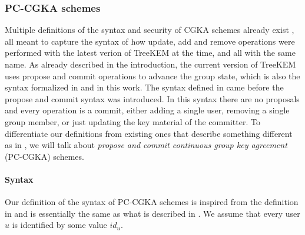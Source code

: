 \subsubsection{PC-CGKA schemes}

Multiple definitions of the syntax and security of CGKA schemes already exist \cite{rtreekem,ttkem,modular-group-messaging}, all meant to capture the syntax of how update, add and remove operations were performed with the latest verion of TreeKEM at the time, and all with the same name. As already described in the introduction, the current version of TreeKEM uses propose and commit operations to advance the group state, which is also the syntax formalized in \cite{modular-group-messaging} and in this work. The syntax defined in \cite{rtreekem,ttkem} came before the propose and commit syntax was introduced. In this syntax there are no proposals and every operation is a commit, either adding a single user, removing a single group member, or just updating the key material of the committer. To differentiate our definitions from existing ones that describe something different as in \cite{rtreekem,ttkem}, we will talk about \emph{propose and commit continuous group key agreement} (PC-CGKA) schemes.

\paragraph{Syntax}

Our definition of the syntax of PC-CGKA schemes is inspired from the definition in \cite{ttkem} and is essentially the same as what is described in \cite[Section 4.1.1]{modular-group-messaging}. We assume that every user $u$ is identified by some value $id_u$.

